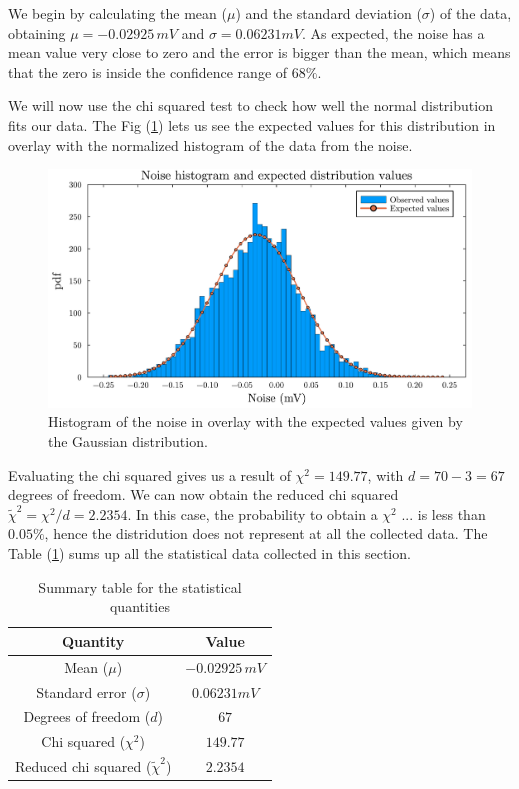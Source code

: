 \documentclass[a4paper,12pt]{article}
\begin{document}
\par We begin by calculating the mean ($\mu$) and the standard deviation 
($\sigma$) of the data, obtaining $\mu = -0.02925 \, mV$ and $\sigma = 0.06231 mV$.
As expected, the noise has a mean value very close to zero and the error is 
bigger than the mean, which means that the zero is inside the confidence 
range of $68\%$.  

\par We will now use the chi squared test to check how well the normal 
distribution fits our data. The Fig (\ref{plot:Hist_Gauss}) lets us see the expected 
values for this distribution in overlay with the normalized histogram 
of the data from the noise.
\begin{figure}[H]
    \centering
    \includegraphics[width=1\textwidth]{Noise_hist_and_Normal_distr_expected_v.pdf}
    \caption{Histogram of the noise in overlay with the expected values given by the Gaussian distribution.}
    \label{plot:Hist_Gauss}
\end{figure}

\par Evaluating the chi squared gives us a result of $\chi^2 = 149.77$, 
with $d=70-3=67$ degrees of freedom. We can now obtain the reduced 
chi squared $\tilde{\chi}^2 = \chi^2 / d = 2.2354$. In this case, 
the probability to obtain a  $\chi^2$ ... is less than $0.05\%$, 
hence the distridution does not represent at all the collected data.
The Table (\ref{tab:summary_table}) 
sums up all the statistical data collected in this section.

\begin{table}[h]
    \centering
    \begin{tabular}{|c|c|}
        \hline
        Quantity & Value \\
        \hline
        Mean ($\mu$) & $-0.02925 \, mV$ \\
        \hline
        Standard error ($\sigma$) & $0.06231 mV$ \\
        \hline
        Degrees of freedom ($d$) & $67$ \\
        \hline
        Chi squared ($\chi^2$) & $149.77$ \\
        \hline
        Reduced chi squared ($\tilde{\chi}^2$) & $2.2354$ \\
        \hline
    \end{tabular}
    \caption{Summary table for the statistical quantities}
    \label{tab:summary_table}
\end{table}
\end{document}

